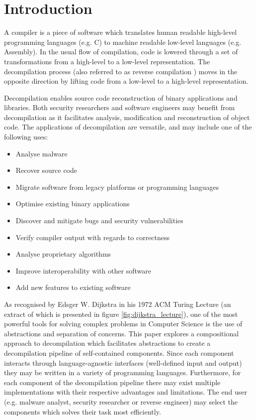 
\section{Introduction}
\label{sec:introduction}

A compiler is a piece of software which translates human readable high-level programming languages (e.g. C) to machine readable low-level languages (e.g. Assembly). In the usual flow of compilation, code is lowered through a set of transformations from a high-level to a low-level representation. The decompilation process (also referred to as reverse compilation \cite{reverse_comp}) moves in the opposite direction by lifting code from a low-level to a high-level representation.

Decompilation enables source code reconstruction of binary applications and libraries. Both security researchers and software engineers may benefit from decompilation as it facilitates analysis, modification and reconstruction of object code. The applications of decompilation are versatile, and may include one of the following uses:

\begin{itemize}
	\item Analyse malware
	\item Recover source code
	\item Migrate software from legacy platforms or programming languages
	\item Optimise existing binary applications
	\item Discover and mitigate bugs and security vulnerabilities
	\item Verify compiler output with regards to correctness
	\item Analyse proprietary algorithms
	\item Improve interoperability with other software
	\item Add new features to existing software
\end{itemize}

As recognised by Edsger W. Dijkstra in his 1972 ACM Turing Lecture (an extract of which is presented in figure \ref{fig:dijkstra_lecture}), one of the most powerful tools for solving complex problems in Computer Science is the use of abstractions and separation of concerns. This paper explores a compositional approach to decompilation which facilitates abstractions to create a decompilation pipeline of self-contained components. Since each component interacts through language-agnostic interfaces (well-defined input and output) they may be written in a variety of programming languages. Furthermore, for each component of the decompilation pipeline there may exist multiple implementations with their respective advantages and limitations. The end user (e.g. malware analyst, security researcher or reverse engineer) may select the components which solves their task most efficiently.

